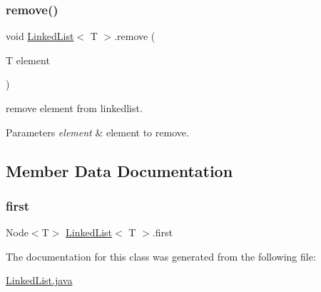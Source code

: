\subsubsection{\texorpdfstring{remove()}{remove()}}
{\footnotesize\ttfamily void \mbox{\hyperlink{class_linked_list}{Linked\+List}}$<$ T $>$.remove (\begin{DoxyParamCaption}\item[{T}]{element }\end{DoxyParamCaption})\hspace{0.3cm}{\ttfamily [inline]}}

remove element from linkedlist. 
\begin{DoxyParams}{Parameters}
{\em element} & element to remove. \\
\hline
\end{DoxyParams}


\subsection{Member Data Documentation}
\mbox{\label{class_linked_list_a34f1f7a8bd8fd70f2131b2e82f58cb32}} 
\subsubsection{\texorpdfstring{first}{first}}
{\footnotesize\ttfamily Node$<$T$>$ \mbox{\hyperlink{class_linked_list}{Linked\+List}}$<$ T $>$.first\hspace{0.3cm}{\ttfamily [private]}}



The documentation for this class was generated from the following file\+:\begin{DoxyCompactItemize}
\item 
\mbox{\hyperlink{_linked_list_8java}{Linked\+List.\+java}}\end{DoxyCompactItemize}
